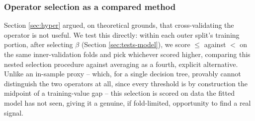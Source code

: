 \documentclass[5p,twocolumn,authoryear]{elsarticle}
\theoremstyle{plain}%
\theoremstyle{remark}%
\theoremstyle{definition}%
\begin{document}
\begin{table}[tbp]
  \caption{Performance restricted to instances that hit a biased node (Section \ref{sec:biased-instances}). \emph{median hit rate} is the fraction of test instances, pooled across the $R=100$ splits, that hit a biased node; $r_S(\text{hit}, \text{effect})$ is the Spearman correlation, across the 20-dataset pool, between per-dataset hit rate and the heavy-tail effect size of Figure \ref{fig:heavytail}; $n$ qualified counts datasets with at least one outer split containing $\ge 5$ hit instances, the minimum required to compute a per-split score restricted to the hit subset; wins/losses, the sign-test $p$-value, Fisher $p$, and $n_{sig}$ are computed exactly as in Table \ref{tab:meta}, restricted to hit instances within qualifying datasets/splits. A dash indicates fewer than two qualifying datasets, too few for a meaningful test.}
  \label{tab:biasedinstance}
  \centering
    \begin{footnotesize}
      \resizebox{\linewidth}{!}{}
    \end{footnotesize}
\end{table}


\subsubsection{Operator selection as a compared method}
\label{sec:select}

Section \ref{sec:hyper} argued, on theoretical grounds, that cross-validating the operator is not useful. We test this directly: within each outer split's training portion, after selecting $\beta$ (Section \ref{sec:tests-model}), we score $\leq$ against $<$ on the same inner-validation folds and pick whichever scored higher, comparing this nested selection procedure against averaging as a fourth, explicit alternative. Unlike an in-sample proxy -- which, for a single decision tree, provably cannot distinguish the two operators at all, since every threshold is by construction the midpoint of a training-value gap -- this selection is scored on data the fitted model has not seen, giving it a genuine, if fold-limited, opportunity to find a real signal.
\end{document}
